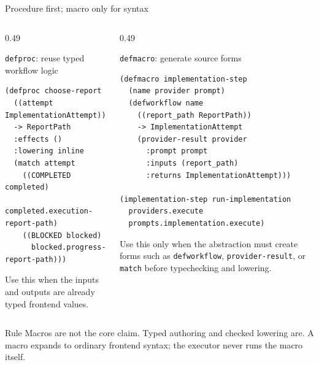 \documentclass[aspectratio=169]{beamer}
\begin{document}
\begin{frame}[fragile]{Procedure first; macro only for syntax}
\scriptsize
\begin{columns}[T,totalwidth=\textwidth]
\begin{column}{0.49\textwidth}
\begin{block}{\texttt{defproc}: reuse typed workflow logic}
\begin{lstlisting}[basicstyle=\ttfamily\fontsize{5.0}{5.55}\selectfont]
(defproc choose-report
  ((attempt ImplementationAttempt))
  -> ReportPath
  :effects ()
  :lowering inline
  (match attempt
    ((COMPLETED completed)
      completed.execution-report-path)
    ((BLOCKED blocked)
      blocked.progress-report-path)))
\end{lstlisting}
\end{block}
\vspace{0.1em}
\footnotesize
Use this when the inputs and outputs are already typed frontend values.
\end{column}
\begin{column}{0.49\textwidth}
\begin{block}{\texttt{defmacro}: generate source forms}
\begin{lstlisting}[basicstyle=\ttfamily\fontsize{5.0}{5.55}\selectfont]
(defmacro implementation-step
  (name provider prompt)
  (defworkflow name
    ((report_path ReportPath))
    -> ImplementationAttempt
    (provider-result provider
      :prompt prompt
      :inputs (report_path)
      :returns ImplementationAttempt)))

(implementation-step run-implementation
  providers.execute
  prompts.implementation.execute)
\end{lstlisting}
\end{block}
\footnotesize
Use this only when the abstraction must create forms such as
\texttt{defworkflow}, \texttt{provider-result}, or \texttt{match} before
typechecking and lowering.
\end{column}
\end{columns}
\vspace{0.3em}
\begin{block}{Rule}
\footnotesize
Macros are not the core claim. Typed authoring and checked lowering are. A macro
expands to ordinary frontend syntax; the executor never runs the macro itself.
\end{block}
\end{frame}
\end{document}

